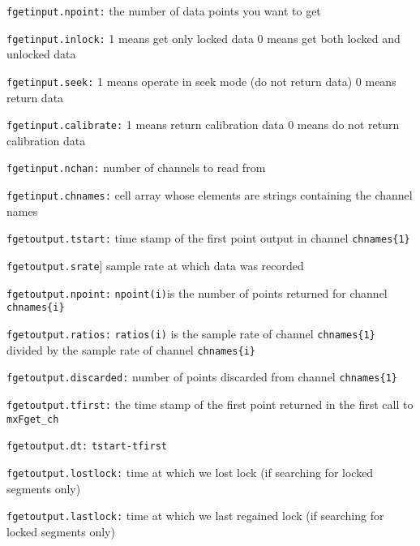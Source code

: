 \begin{description}
\item{\tt fgetinput.npoint:} the number of data points you want to get

\item{\tt fgetinput.inlock:} 1 means get only locked data 0 means get
both locked and unlocked data

\item{\tt fgetinput.seek:} 1 means operate in seek mode (do not return
data) 0 means return data

\item{\tt fgetinput.calibrate:} 1 means return calibration data 0 means
do not return calibration data

\item{\tt fgetinput.nchan:} number of channels to read from

\item{\tt fgetinput.chnames:} cell array whose elements are strings
containing the channel names

\item{\tt fgetoutput.tstart:} time stamp of the first point output in
channel \texttt{chnames\{1\}}

\item{\tt fgetoutput.srate}] sample rate at which data was recorded

\item{\tt fgetoutput.npoint:} \texttt{npoint(i)}is the number of points
returned for channel \texttt{chnames\{i\}}

\item{\tt fgetoutput.ratios:} \texttt{ratios(i)} is the sample rate of
channel \texttt{chnames\{1\}} divided by the sample rate of channel \texttt{chnames\{i\}}

\item{\tt fgetoutput.discarded:} number of points discarded from channel \texttt{chnames\{1\}}

\item{\tt fgetoutput.tfirst:} the time stamp of the first point returned
in the first call to \texttt{mxFget\_ch}

\item{\tt fgetoutput.dt:} \texttt{tstart-tfirst}

\item{\tt fgetoutput.lostlock:} time at which we lost lock (if searching
for locked segments only)

\item{\tt fgetoutput.lastlock:} time at which we last regained lock (if
searching for locked segments only)


\end{description}
